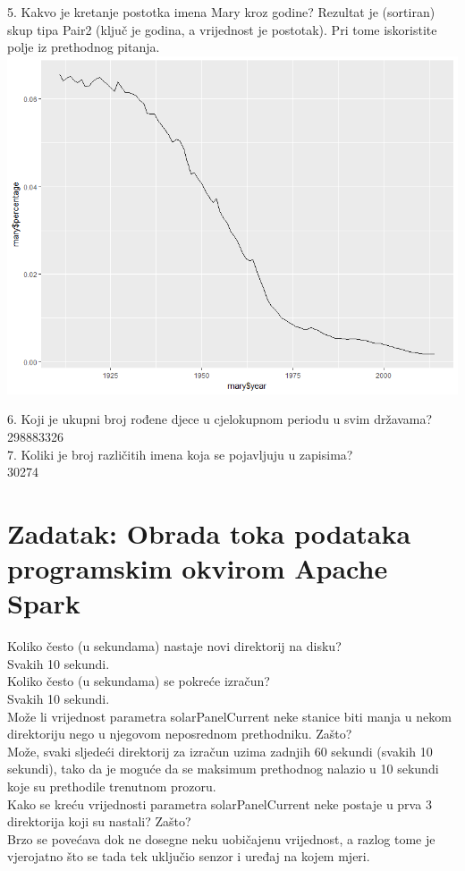 \documentclass[paper=a4, fontsize=11pt]{scrartcl}
\numberwithin{equation}{section}		%
\numberwithin{figure}{section}			%
\numberwithin{table}{section}				%
\begin{document}
5. Kakvo je kretanje postotka imena Mary kroz godine? Rezultat je (sortiran) skup tipa Pair2 (ključ je godina,
a vrijednost je postotak). Pri tome iskoristite polje iz prethodnog pitanja.\\

\includegraphics[width=\textwidth]{mary.png}

6. Koji je ukupni broj rođene djece u cjelokupnom periodu u svim državama?\\
298883326\\

7. Koliki je broj različitih imena koja se pojavljuju u zapisima?\\
30274

\pagebreak

\section{Zadatak: Obrada toka podataka programskim okvirom Apache Spark}

Koliko često (u sekundama) nastaje novi direktorij na disku?\\
Svakih 10 sekundi.\\

Koliko često (u sekundama) se pokreće izračun?\\
Svakih 10 sekundi.\\

Može li vrijednost parametra solarPanelCurrent neke stanice biti manja u nekom direktoriju nego u
njegovom neposrednom prethodniku. Zašto?\\
Može, svaki sljedeći direktorij za izračun uzima zadnjih 60 sekundi (svakih 10 sekundi), tako da je moguće da se maksimum prethodnog nalazio u 10 sekundi koje su prethodile trenutnom prozoru.\\

Kako se kreću vrijednosti parametra solarPanelCurrent neke postaje u prva 3 direktorija koji su nastali?
Zašto?\\
Brzo se povećava dok ne dosegne neku uobičajenu vrijednost, a razlog tome je vjerojatno što se tada tek uključio senzor i uređaj na kojem mjeri.
\end{document}
